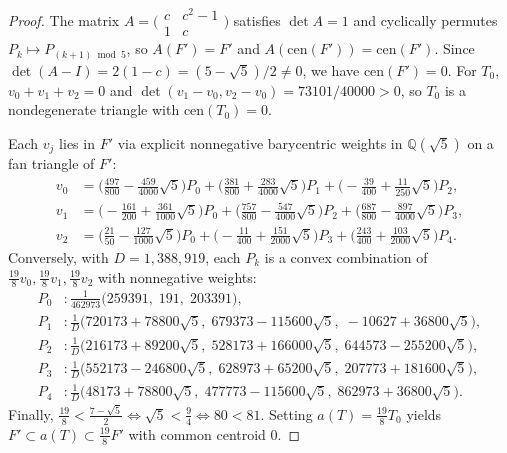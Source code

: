 \documentclass[11pt]{article}
\begin{document}
\begin{proof}
The matrix $A = \bigl(\begin{smallmatrix}c & c^2 - 1 \\ 1 & c\end{smallmatrix}\bigr)$
satisfies $\det A = 1$ and cyclically permutes $P_k \mapsto P_{(k+1)\bmod 5}$,
so $A(F') = F'$ and $A(\mathrm{cen}(F')) = \mathrm{cen}(F')$. Since
$\det(A - I) = 2(1 - c) = (5 - \sqrt{5})/2 \neq 0$, we have
$\mathrm{cen}(F') = 0$. For $T_0$, $v_0 + v_1 + v_2 = 0$ and
$\det(v_1 - v_0, v_2 - v_0) = 73101/40000 > 0$, so $T_0$ is a nondegenerate
triangle with $\mathrm{cen}(T_0) = 0$.

Each $v_j$ lies in $F'$ via explicit nonnegative barycentric weights in
$\mathbb{Q}(\sqrt{5})$ on a fan triangle of $F'$:
\begin{align*}
v_0 &= \bigl(\tfrac{497}{800} - \tfrac{459}{4000}\sqrt{5}\bigr) P_0
     + \bigl(\tfrac{381}{800} + \tfrac{283}{4000}\sqrt{5}\bigr) P_1
     + \bigl(-\tfrac{39}{400} + \tfrac{11}{250}\sqrt{5}\bigr) P_2,\\
v_1 &= \bigl(-\tfrac{161}{200} + \tfrac{361}{1000}\sqrt{5}\bigr) P_0
     + \bigl(\tfrac{757}{800} - \tfrac{547}{4000}\sqrt{5}\bigr) P_2
     + \bigl(\tfrac{687}{800} - \tfrac{897}{4000}\sqrt{5}\bigr) P_3,\\
v_2 &= \bigl(\tfrac{21}{50} - \tfrac{127}{1000}\sqrt{5}\bigr) P_0
     + \bigl(-\tfrac{11}{400} + \tfrac{151}{2000}\sqrt{5}\bigr) P_3
     + \bigl(\tfrac{243}{400} + \tfrac{103}{2000}\sqrt{5}\bigr) P_4.
\end{align*}
Conversely, with $D = 1{,}388{,}919$, each $P_k$ is a convex combination of
$\frac{19}{8} v_0, \frac{19}{8} v_1, \frac{19}{8} v_2$ with nonnegative weights:
\begin{align*}
P_0 &: \tfrac{1}{462973}\bigl(259391,\; 191,\; 203391\bigr),\\
P_1 &: \tfrac{1}{D}\bigl(720173 + 78800\sqrt{5},\; 679373 - 115600\sqrt{5},\; -10627 + 36800\sqrt{5}\bigr),\\
P_2 &: \tfrac{1}{D}\bigl(216173 + 89200\sqrt{5},\; 528173 + 166000\sqrt{5},\; 644573 - 255200\sqrt{5}\bigr),\\
P_3 &: \tfrac{1}{D}\bigl(552173 - 246800\sqrt{5},\; 628973 + 65200\sqrt{5},\; 207773 + 181600\sqrt{5}\bigr),\\
P_4 &: \tfrac{1}{D}\bigl(48173 + 78800\sqrt{5},\; 477773 - 115600\sqrt{5},\; 862973 + 36800\sqrt{5}\bigr).
\end{align*}
Finally, $\frac{19}{8} < \frac{7 - \sqrt{5}}{2} \iff \sqrt{5} < \frac{9}{4}
\iff 80 < 81$. Setting $a(T) = \frac{19}{8} T_0$ yields
$F' \subset a(T) \subset \frac{19}{8} F'$ with common centroid $0$.
\end{proof}
\end{document}

